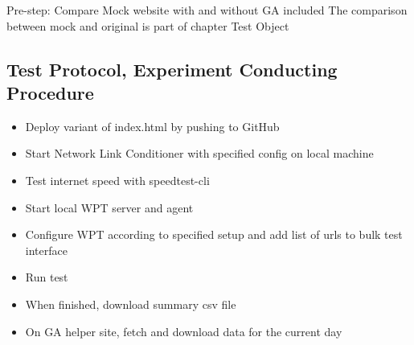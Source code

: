 Pre-step: Compare Mock website with and without GA included
The comparison between mock and original is part of chapter Test Object




\subsection{Test Protocol, Experiment Conducting Procedure}

\begin{itemize}
\item Deploy variant of index.html by pushing to GitHub
\item Start Network Link Conditioner with specified config on local machine
\item Test internet speed with speedtest-cli
\item Start local WPT server and agent
\item Configure WPT according to specified setup and add list of urls to bulk test interface
\item Run test
\item When finished, download summary csv file
\item On GA helper site, fetch and download data for the current day
\end{itemize}



